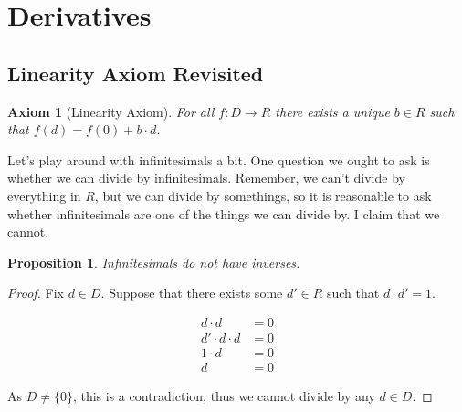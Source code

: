 \documentclass[]{book}
\newtheorem{prop}[thm]{Proposition}
\newtheorem{ax}{Axiom}
\begin{document}
\hypertarget{derivatives}{%
\section{Derivatives}\label{derivatives}}

\hypertarget{linearity-axiom-revisited}{%
\subsection{Linearity Axiom Revisited}\label{linearity-axiom-revisited}}

\begin{ax}[Linearity Axiom]
For all $f : D \to R$ there exists a unique $b \in R$ such that $f(d) = f(0) + b \cdot d$.
\end{ax}

Let's play around with infinitesimals a bit. One question we ought to ask is whether we can divide by infinitesimals. Remember, we can't divide by everything in $R$, but we can divide by somethings, so it is reasonable to ask whether infinitesimals are one of the things we can divide by. I claim that we cannot.

\begin{prop}
Infinitesimals do not have inverses.
\end{prop}
\begin{proof}
Fix $d \in D$. Suppose that there exists some $d' \in R$ such that $d \cdot d' = 1$.

\begin{align*}
  d \cdot d &= 0 \\
  d' \cdot d \cdot d &= 0 \\
  1 \cdot d &= 0 \\
  d &= 0
\end{align*}

As $D \neq \{0\}$, this is a contradiction, thus we cannot divide by any $d \in D$.
\end{proof}
\end{document}
